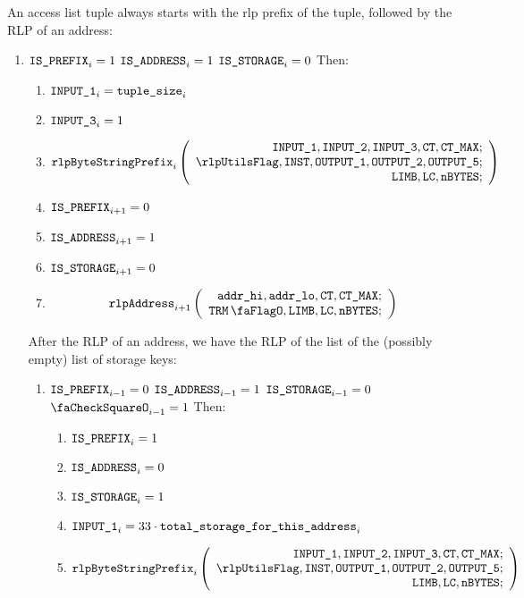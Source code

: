 An access list tuple always starts with the rlp prefix of the tuple, followed by the RLP of an address:
\begin{enumerate}[resume]
	\item \If $\texttt{IS\_PREFIX}_{i} = 1$ \et $\texttt{IS\_ADDRESS}_{i} = 1$ \et $\texttt{IS\_STORAGE}_{i} = 0$ Then:
		\begin{enumerate}
			\item $\texttt{INPUT\_1}_{i} = \texttt{tuple\_size}_{i}$
			\item $\texttt{INPUT\_3}_{i} = 1$ 
			\item 
				\[
					\rlpBytestringPrefix_{i}
					\left(
					\begin{array}{r}
						\inputColumn{1},
						\inputColumn{2},
						\inputColumn{3},
						\ct,
						\maxCt; \\
						\rlpUtilsFlag,
						\INST,
						\resultColumn{1},
						\resultColumn{2},
						\resultColumn{5}; \\
						\limb,
						\lc,
						\limbsize; \\
					\end{array}
					\right)
				\]
			\item $\texttt{IS\_PREFIX} _{i+1} = 0$
			\item $\texttt{IS\_ADDRESS}   _{i+1} = 1$
			\item $\texttt{IS\_STORAGE}    _{i+1} = 0$	
			\item 
				\[
					\rlpAddress_{i+1}
					\left(
					\begin{array}{r}
						\locAddressHi,
						\locAddressLo,
						\ct,
						\maxCt; \\
						\trmFlag,
						\limb,
						\lc,
						\limbsize; \\
					\end{array}
					\right)
				\]
		\end{enumerate}

		After the RLP of an address, we have the RLP of the list of the (possibly empty) list of storage keys: 
		\begin{enumerate}[resume]
			\item \If $\texttt{IS\_PREFIX}_{i-1} = 0$ \et $\texttt{IS\_ADDRESS}_{i-1} = 1$ \et $\texttt{IS\_STORAGE}_{i-1} = 0$ \et $\done_{i-1} =1$ Then:
				\begin{enumerate}
					\item $\texttt{IS\_PREFIX} _{i} = 1$
					\item $\texttt{IS\_ADDRESS}   _{i} = 0$
					\item $\texttt{IS\_STORAGE}    _{i} = 1$
					\item $\texttt{INPUT\_1}_{i} = 33 \cdot \texttt{total\_storage\_for\_this\_address}_{i}$
					\item 
						\[
							\rlpBytestringPrefix_{i}
							\left(
							\begin{array}{r}
								\inputColumn{1},
								\inputColumn{2},
								\inputColumn{3},
								\ct,
								\maxCt; \\
								\rlpUtilsFlag,
								\INST,
								\resultColumn{1},
								\resultColumn{2},
								\resultColumn{5}; \\
								\limb,
								\lc,
								\limbsize; \\
							\end{array}
							\right)
						\]


\end{enumerate}
\end{enumerate}
\end{enumerate}
